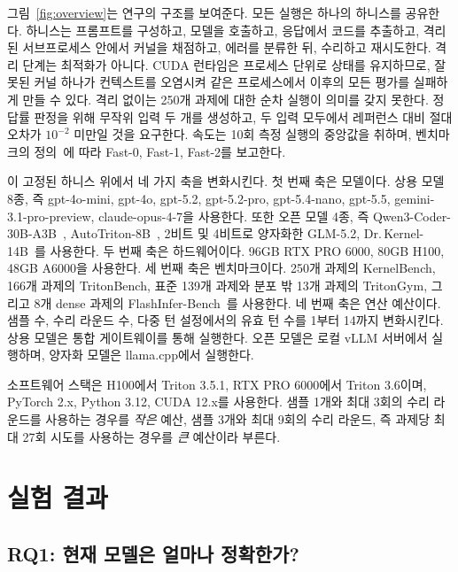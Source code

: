 \documentclass[11pt]{article}
\begin{document}


그림~\ref{fig:overview}는 연구의 구조를 보여준다. 모든 실행은 하나의 하니스를 공유한다. 하니스는
프롬프트를 구성하고, 모델을 호출하고, 응답에서 코드를 추출하고, 격리된 서브프로세스 안에서 커널을
채점하고, 에러를 분류한 뒤, 수리하고 재시도한다. 격리 단계는 최적화가 아니다. CUDA 런타임은
프로세스 단위로 상태를 유지하므로, 잘못된 커널 하나가 컨텍스트를 오염시켜 같은 프로세스에서 이후의
모든 평가를 실패하게 만들 수 있다. 격리 없이는 250개 과제에 대한 순차 실행이 의미를 갖지 못한다.
정답률 판정을 위해 무작위 입력 두 개를 생성하고, 두 입력 모두에서 레퍼런스 대비 절대 오차가
$10^{-2}$ 미만일 것을 요구한다. 속도는 10회 측정 실행의 중앙값을 취하며, 벤치마크의
정의~\citep{ouyang2024kernelbench}에 따라 Fast-0, Fast-1, Fast-2를 보고한다.

이 고정된 하니스 위에서 네 가지 축을 변화시킨다. 첫 번째 축은 모델이다. 상용 모델 8종, 즉
gpt-4o-mini, gpt-4o, gpt-5.2, gpt-5.2-pro, gpt-5.4-nano, gpt-5.5,
gemini-3.1-pro-preview, claude-opus-4-7을 사용한다. 또한 오픈 모델 4종, 즉
Qwen3-Coder-30B-A3B~\citep{hui2024qwencoder}, AutoTriton-8B~\citep{li2025autotriton}, 2비트 및 4비트로
양자화한 GLM-5.2, Dr.\,Kernel-14B~\citep{drkernel2026}를 사용한다. 두 번째 축은 하드웨어이다.
96GB RTX PRO 6000, 80GB H100, 48GB A6000을 사용한다. 세 번째 축은 벤치마크이다. 250개 과제의
KernelBench, 166개 과제의 TritonBench, 표준 139개 과제와 분포 밖 13개 과제의 TritonGym, 그리고
8개 dense 과제의 FlashInfer-Bench~\citep{flashinferbench2025}를 사용한다. 네 번째 축은 연산 예산이다.
샘플 수, 수리 라운드 수, 다중 턴 설정에서의 유효 턴 수를 1부터 14까지 변화시킨다.
상용 모델은 통합 게이트웨이를 통해 실행한다. 오픈 모델은 로컬 vLLM 서버에서 실행하며, 양자화
모델은 llama.cpp에서 실행한다.

소프트웨어 스택은 H100에서 Triton 3.5.1, RTX PRO 6000에서 Triton 3.6이며, PyTorch 2.x,
Python 3.12, CUDA 12.x를 사용한다. 샘플 1개와 최대 3회의 수리 라운드를 사용하는 경우를
\emph{작은} 예산, 샘플 3개와 최대 9회의 수리 라운드, 즉 과제당 최대 27회 시도를 사용하는 경우를
\emph{큰} 예산이라 부른다.

\section{실험 결과}\label{sec:results}

\subsection{RQ1: 현재 모델은 얼마나 정확한가?}\label{sec:rq1}
\end{document}
